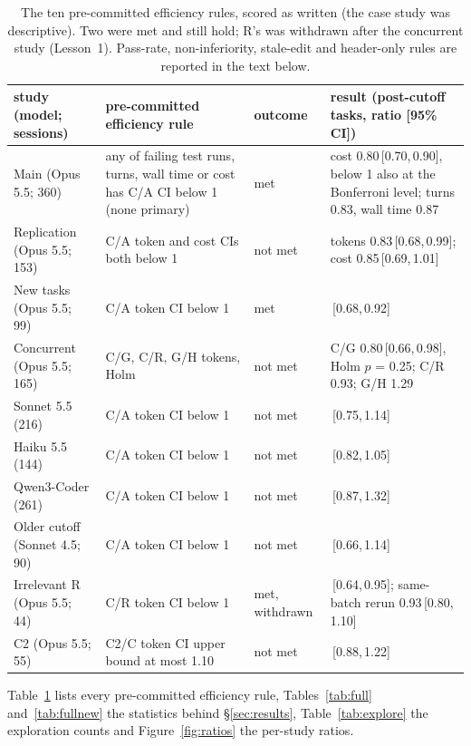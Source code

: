 \documentclass[11pt]{article}
\newcommand{\ci}[2]{\,[#1,\,#2]}
\begin{document}
\begin{table}[t]
\centering
\footnotesize
\setlength{\tabcolsep}{4pt}
\begin{tabular}{>{\raggedright\arraybackslash}p{3.4cm}>{\raggedright\arraybackslash}p{4.5cm}>{\raggedright\arraybackslash}p{1.6cm}>{\raggedright\arraybackslash}p{5.1cm}}
\toprule
study (model; sessions) & pre-committed efficiency rule & outcome & result (post-cutoff tasks, ratio [95\% CI]) \\
\midrule
Main (Opus 5.5; 360) & any of failing test runs, turns, wall time or cost has C/A CI below 1 (none primary) & met & cost 0.80\ci{0.70}{0.90}, below 1 also at the Bonferroni level; turns 0.83, wall time 0.87 \\
Replication (Opus 5.5; 153) & C/A token and cost CIs both below 1 & not met & tokens 0.83\ci{0.68}{0.99}; cost 0.85\ci{0.69}{1.01} \\
New tasks (Opus 5.5; 99) & C/A token CI below 1 & met & 0.79\ci{0.68}{0.92} \\
Concurrent (Opus 5.5; 165) & C/G, C/R, G/H tokens, Holm & not met & C/G 0.80\ci{0.66}{0.98}, Holm $p$ = 0.25; C/R 0.93; G/H 1.29 \\
Sonnet 5.5 (216) & C/A token CI below 1 & not met & 0.93\ci{0.75}{1.14} \\
Haiku 5.5 (144) & C/A token CI below 1 & not met & 0.92\ci{0.82}{1.05} \\
Qwen3-Coder (261) & C/A token CI below 1 & not met & 1.08\ci{0.87}{1.32} \\
Older cutoff (Sonnet 4.5; 90) & C/A token CI below 1 & not met & 0.88\ci{0.66}{1.14} \\
Irrelevant R (Opus 5.5; 44) & C/R token CI below 1 & met, withdrawn & 0.78\ci{0.64}{0.95}; same-batch rerun 0.93\ci{0.80}{1.10} \\
C2 (Opus 5.5; 55) & C2/C token CI upper bound at most 1.10 & not met & 1.03\ci{0.88}{1.22} \\
\bottomrule
\end{tabular}
\caption{The ten pre-committed efficiency rules, scored as written (the case study was descriptive). Two were met and still hold; R's was withdrawn after the concurrent study (Lesson~1). Pass-rate, non-inferiority, stale-edit and header-only rules are reported in the text below.}
\label{tab:rules}
\end{table}

Table~\ref{tab:rules} lists every pre-committed efficiency rule, Tables~\ref{tab:full} and~\ref{tab:fullnew} the statistics behind \S\ref{sec:results}, Table~\ref{tab:explore} the exploration counts and Figure~\ref{fig:ratios} the per-study ratios.
\end{document}
